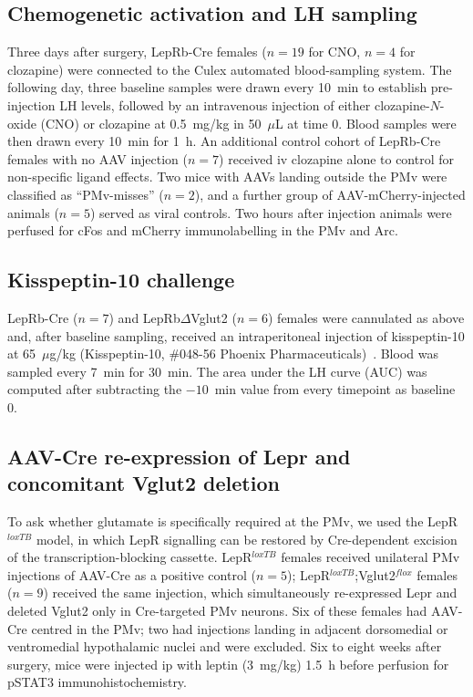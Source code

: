 \documentclass[11pt]{article}
\begin{document}
\subsection{Chemogenetic activation and LH sampling}
Three days after surgery, LepRb-Cre females ($n=19$ for CNO, $n=4$ for clozapine) were connected to the Culex automated blood-sampling system. The following day, three baseline samples were drawn every 10~min to establish pre-injection LH levels, followed by an intravenous injection of either clozapine-$N$-oxide (CNO) or clozapine at 0.5~mg/kg in 50~$\mu$L at time 0. Blood samples were then drawn every 10~min for 1~h. An additional control cohort of LepRb-Cre females with no AAV injection ($n=7$) received iv clozapine alone to control for non-specific ligand effects. Two mice with AAVs landing outside the PMv were classified as ``PMv-misses'' ($n=2$), and a further group of AAV-mCherry-injected animals ($n=5$) served as viral controls. Two hours after injection animals were perfused for cFos and mCherry immunolabelling in the PMv and Arc.

\subsection{Kisspeptin-10 challenge}
LepRb-Cre ($n=7$) and LepRb$\Delta$Vglut2 ($n=6$) females were cannulated as above and, after baseline sampling, received an intraperitoneal injection of kisspeptin-10 at 65~$\mu$g/kg (Kisspeptin-10, \#048-56 Phoenix Pharmaceuticals)~\citep{gottsch2004role}. Blood was sampled every 7~min for 30~min. The area under the LH curve (AUC) was computed after subtracting the $-10$~min value from every timepoint as baseline 0.

\subsection{AAV-Cre re-expression of Lepr and concomitant Vglut2 deletion}
To ask whether glutamate is specifically required at the PMv, we used the LepR$^{loxTB}$ model, in which LepR signalling can be restored by Cre-dependent excision of the transcription-blocking cassette. LepR$^{loxTB}$ females received unilateral PMv injections of AAV-Cre as a positive control ($n=5$); LepR$^{loxTB}$;Vglut2$^{flox}$ females ($n=9$) received the same injection, which simultaneously re-expressed Lepr and deleted Vglut2 only in Cre-targeted PMv neurons. Six of these females had AAV-Cre centred in the PMv; two had injections landing in adjacent dorsomedial or ventromedial hypothalamic nuclei and were excluded. Six to eight weeks after surgery, mice were injected ip with leptin (3~mg/kg) 1.5~h before perfusion for pSTAT3 immunohistochemistry.
\end{document}
